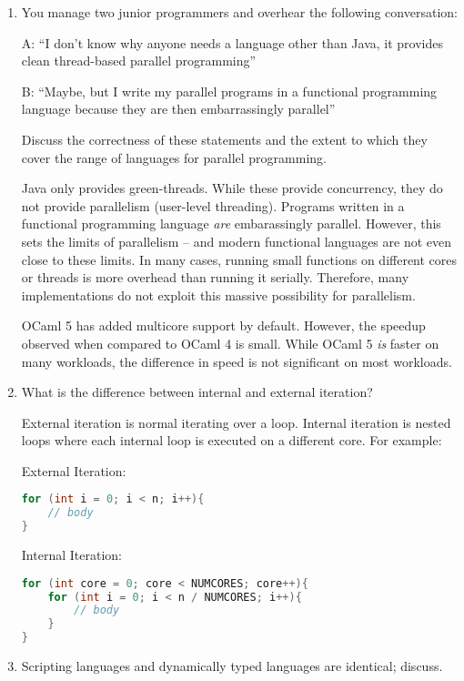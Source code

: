 \documentclass[10pt,\jkfside,a4paper]{article}
\begin{document}
\begin{enumerate}

\item You manage two junior programmers and overhear the following
conversation:

A: ``I don't know why anyone needs a language other than Java, it provides
clean thread-based parallel programming''

B: ``Maybe, but I write my parallel programs in a functional programming
language because they are then embarrassingly parallel''

Discuss the correctness of these statements and the extent to which they
cover the range of languages for parallel programming.

Java only provides green-threads. While these provide concurrency, they do
not provide parallelism (user-level threading). Programs written in a
functional programming language \textit{are} embarassingly parallel. However,
this sets the limits of parallelism -- and modern functional languages are
not even close to these limits. In many cases, running small functions on
different cores or threads is more overhead than running it serially.
Therefore, many implementations do not exploit this massive possibility for
parallelism.

OCaml 5 has added multicore support by default. However, the speedup
observed when compared to OCaml 4 is small. While OCaml 5 \textit{is} faster
on many workloads, the difference in speed is not significant on most
workloads.

\item What is the difference between internal and external iteration?

External iteration is normal iterating over a loop. Internal iteration is
nested loops where each internal loop is executed on a different core. For
example:

External Iteration:
\begin{lstlisting}[language=C]
for (int i = 0; i < n; i++){
	// body
}
\end{lstlisting}

Internal Iteration:
\begin{lstlisting}[language=C]
for (int core = 0; core < NUMCORES; core++){
	for (int i = 0; i < n / NUMCORES; i++){
		// body
	}
}
\end{lstlisting}

\item Scripting languages and dynamically typed languages are identical;
discuss.


\end{enumerate}
\end{document}
